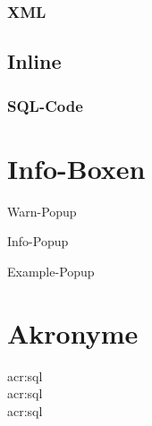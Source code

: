 \subsubsection{XML}

\subsection{Inline}

\subsubsection{SQL-Code}


\section{Info-Boxen}

\begin{warn-popup}
  Warn-Popup
\end{warn-popup}

\begin{info-popup}
  Info-Popup
\end{info-popup}

\begin{example-popup}
  Example-Popup
\end{example-popup}


\section{Akronyme}
\acrfull{acr:sql}\\
\acrlong{acr:sql}\\
\acrshort{acr:sql}\\


